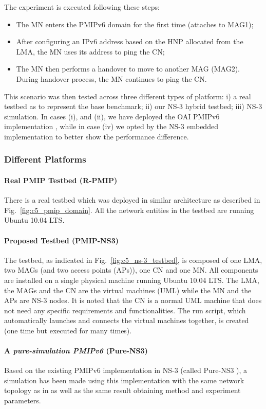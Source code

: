 The experiment is executed following these steps:
\begin{itemize}
\item The MN enters the PMIPv6 domain for the first time (attaches to MAG1);
\item After configuring an IPv6 address based on the HNP allocated from the LMA, the MN uses its address to ping the CN;
\item The MN then performs a handover to move to another MAG (MAG2). During handover process, the MN continues to ping the CN.
\end{itemize}

This scenario was then tested across three different types of platform: i) a real testbed as to represent the base benchmark; ii) our NS-3 hybrid testbed; iii) NS-3 simulation. In cases (i), and (ii), we have deployed the OAI PMIPv6 implementation \cite{oai_pmip}, while in case (iv) we opted by the NS-3 embedded implementation to better show the performance difference.
\subsubsection{Different Platforms}

\paragraph{Real PMIP Testbed (R-PMIP)}
There is a real testbed \cite{oai_pmip} which was deployed in similar architecture as described in Fig.~\ref{fig:c5_pmip_domain}. All the network entities in the testbed are running Ubuntu 10.04 LTS.

\paragraph{Proposed Testbed (PMIP-NS3)}
The testbed, as indicated in Fig.~\ref{fig:c5_ns-3_testbed}, is composed of one LMA, two MAGs (and two access points (APs)), one CN and one MN. All components are installed on a single physical machine running Ubuntu 10.04 LTS. The LMA, the MAGs and the CN are the virtual machines (UML) while the MN and the APs are NS-3 nodes. It is noted that the CN is a normal UML machine that does not need any specific requirements and functionalities. The run script, which automatically launches and connects the virtual machines together, is created (one time but executed for many times). 
\paragraph{A \textit{pure-simulation PMIPv6} (Pure-NS3)}
Based on the existing PMIPv6 implementation in NS-3 (called Pure-NS3 \cite{pmip_ns3}), a simulation has been made using this implementation with the same network topology as in as well as the same result obtaining method and experiment parameters.

